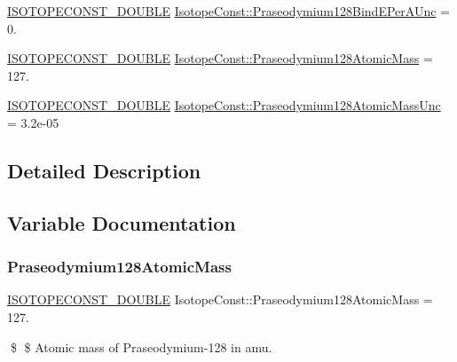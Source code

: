 \begin{DoxyCompactItemize}
\item 
\mbox{\hyperlink{group___isotope_const-_macros_ga8f45a7272ce02c0b4c65c44636ed719a}{I\+S\+O\+T\+O\+P\+E\+C\+O\+N\+S\+T\+\_\+\+D\+O\+U\+B\+LE}} \mbox{\hyperlink{group___isotope_const-_praseodymium-_pr128_gacf12f58bad084e744debe2d2458718be}{Isotope\+Const\+::\+Praseodymium128\+Bind\+E\+Per\+A\+Unc}} = 0.
\item 
\mbox{\hyperlink{group___isotope_const-_macros_ga8f45a7272ce02c0b4c65c44636ed719a}{I\+S\+O\+T\+O\+P\+E\+C\+O\+N\+S\+T\+\_\+\+D\+O\+U\+B\+LE}} \mbox{\hyperlink{group___isotope_const-_praseodymium-_pr128_ga9b9f2f863ab3b8caaa740bdc629079fd}{Isotope\+Const\+::\+Praseodymium128\+Atomic\+Mass}} = 127.
\item 
\mbox{\hyperlink{group___isotope_const-_macros_ga8f45a7272ce02c0b4c65c44636ed719a}{I\+S\+O\+T\+O\+P\+E\+C\+O\+N\+S\+T\+\_\+\+D\+O\+U\+B\+LE}} \mbox{\hyperlink{group___isotope_const-_praseodymium-_pr128_ga58b1648e1a1ce1bc0b92b832b7127729}{Isotope\+Const\+::\+Praseodymium128\+Atomic\+Mass\+Unc}} = 3.\+2e-\/05
\end{DoxyCompactItemize}


\subsection{Detailed Description}


\subsection{Variable Documentation}
\mbox{\label{group___isotope_const-_praseodymium-_pr128_ga9b9f2f863ab3b8caaa740bdc629079fd}} 
\subsubsection{\texorpdfstring{Praseodymium128\+Atomic\+Mass}{Praseodymium128AtomicMass}}
{\footnotesize\ttfamily \mbox{\hyperlink{group___isotope_const-_macros_ga8f45a7272ce02c0b4c65c44636ed719a}{I\+S\+O\+T\+O\+P\+E\+C\+O\+N\+S\+T\+\_\+\+D\+O\+U\+B\+LE}} Isotope\+Const\+::\+Praseodymium128\+Atomic\+Mass = 127.}

\$ \$ Atomic mass of Praseodymium-\/128 in amu. \mbox{\label{group___isotope_const-_praseodymium-_pr128_ga58b1648e1a1ce1bc0b92b832b7127729}} 
